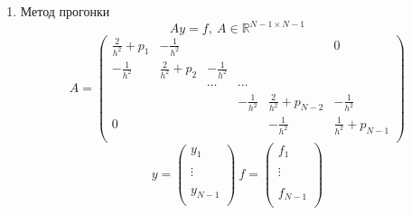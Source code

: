 \documentclass[12pt]{article}
\begin{document}
\begin{enumerate}[I.]
\begin{enumerate}
		      \item Метод прогонки
		            \[Ay=f,\ A\in \mathbb{R}^{N-1\times N-1}\]
		            \[A=
			            \left(\begin{array}{cccccc}
					            \frac{2}{h^2}+p_1 & -\frac{1}{h^2}    &                &                &                       & 0                     \\
					            -\frac{1}{h^2}    & \frac{2}{h^2}+p_2 & -\frac{1}{h^2} &                &                       &                       \\
					                              &                   & \cdots         & \cdots         &                       &                       \\
					                              &                   &                & -\frac{1}{h^2} & \frac{2}{h^2}+p_{N-2} & -\frac{1}{h^2}        \\
					            0                 &                   &                &                & -\frac{1}{h^2}        & \frac{1}{h^2}+p_{N-1} \\
				            \end{array}\right)\]
		            \[
			            y=\left(\begin{array}{c}
					            y_{1}   \\
					            \\
					            \vdots  \\
					            \\
					            y_{N-1} \\
				            \end{array}\right)\
			            f=
			            \left(\begin{array}{c}
					            f_{1}   \\
					            \\
					            \vdots  \\
					            \\
					            f_{N-1} \\
				            \end{array}\right)
		            \]


\end{enumerate}
\end{enumerate}
\end{document}
